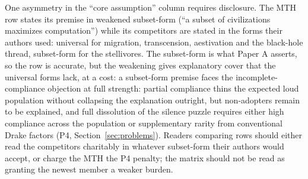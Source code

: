 \documentclass[11pt]{article}
\begin{document}
One asymmetry in the ``core assumption'' column requires disclosure. The MTH row states its premise in weakened subset-form (``a subset of civilizations maximizes computation'') while its competitors are stated in the forms their authors used: universal for migration, transcension, aestivation and the black-hole thread, subset-form for the stellivores. The subset-form is what Paper A asserts, so the row is accurate, but the weakening gives explanatory cover that the universal forms lack, at a cost: a subset-form premise faces the incomplete-compliance objection at full strength: partial compliance thins the expected loud population without collapsing the explanation outright, but non-adopters remain to be explained, and full dissolution of the silence puzzle requires either high compliance across the population or supplementary rarity from conventional Drake factors (P4, Section~\ref{sec:problems}). Readers comparing rows should either read the competitors charitably in whatever subset-form their authors would accept, or charge the MTH the P4 penalty; the matrix should not be read as granting the newest member a weaker burden.
\end{document}
